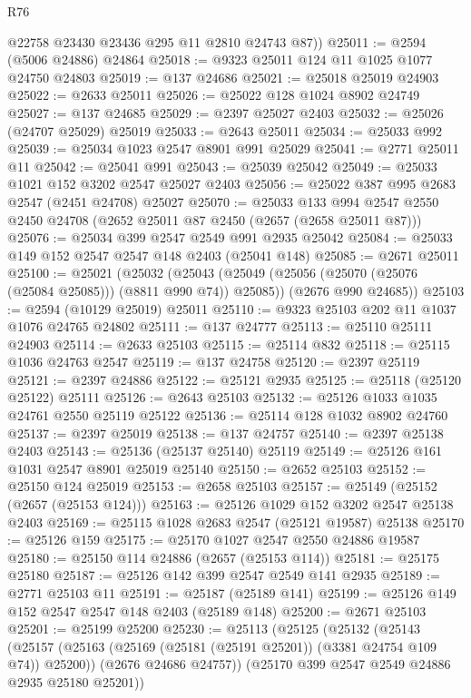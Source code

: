 \begin{lexlean}{R76}
\begin{coremodule}
        @22758
        @23430
        @23436
        @295
        @11
        @2810
        @24743
        @87))
@25011 := @2594 (@5006 @24886) @24864
@25018 := @9323 @25011 @124 @11 @1025 @1077 @24750 @24803
@25019 := @137 @24686
@25021 := @25018 @25019 @24903
@25022 := @2633 @25011
@25026 := @25022 @128 @1024 @8902 @24749
@25027 := @137 @24685
@25029 := @2397 @25027 @2403
@25032 := @25026 (@24707 @25029) @25019
@25033 := @2643 @25011
@25034 := @25033 @992
@25039 := @25034 @1023 @2547 @8901 @991 @25029
@25041 := @2771 @25011 @11
@25042 := @25041 @991
@25043 := @25039 @25042
@25049 := @25033 @1021 @152 @3202 @2547 @25027 @2403
@25056 := @25022 @387 @995 @2683 @2547 (@2451 @24708) @25027
@25070 := @25033
    @133
    @994
    @2547
    @2550
    @2450
    @24708
    (@2652 @25011 @87 @2450 (@2657 (@2658 @25011 @87)))
@25076 := @25034 @399 @2547 @2549 @991 @2935 @25042
@25084 := @25033 @149 @152 @2547 @2547 @148 @2403 (@25041 @148)
@25085 := @2671 @25011
@25100 := @25021
    (@25032
      (@25043 (@25049 (@25056 (@25070 (@25076 (@25084 @25085))) (@8811 @990 @74)) @25085))
      (@2676 @990 @24685))
@25103 := @2594 (@10129 @25019) @25011
@25110 := @9323 @25103 @202 @11 @1037 @1076 @24765 @24802
@25111 := @137 @24777
@25113 := @25110 @25111 @24903
@25114 := @2633 @25103
@25115 := @25114 @832
@25118 := @25115 @1036 @24763 @2547
@25119 := @137 @24758
@25120 := @2397 @25119
@25121 := @2397 @24886
@25122 := @25121 @2935
@25125 := @25118 (@25120 @25122) @25111
@25126 := @2643 @25103
@25132 := @25126 @1033 @1035 @24761 @2550 @25119 @25122
@25136 := @25114 @128 @1032 @8902 @24760
@25137 := @2397 @25019
@25138 := @137 @24757
@25140 := @2397 @25138 @2403
@25143 := @25136 (@25137 @25140) @25119
@25149 := @25126 @161 @1031 @2547 @8901 @25019 @25140
@25150 := @2652 @25103
@25152 := @25150 @124 @25019
@25153 := @2658 @25103
@25157 := @25149 (@25152 (@2657 (@25153 @124)))
@25163 := @25126 @1029 @152 @3202 @2547 @25138 @2403
@25169 := @25115 @1028 @2683 @2547 (@25121 @19587) @25138
@25170 := @25126 @159
@25175 := @25170 @1027 @2547 @2550 @24886 @19587
@25180 := @25150 @114 @24886 (@2657 (@25153 @114))
@25181 := @25175 @25180
@25187 := @25126 @142 @399 @2547 @2549 @141 @2935
@25189 := @2771 @25103 @11
@25191 := @25187 (@25189 @141)
@25199 := @25126 @149 @152 @2547 @2547 @148 @2403 (@25189 @148)
@25200 := @2671 @25103
@25201 := @25199 @25200
@25230 := @25113
    (@25125
      (@25132
        (@25143
          (@25157 (@25163 (@25169 (@25181 (@25191 @25201)) (@3381 @24754 @109 @74)) @25200))
          (@2676 @24686 @24757))
        (@25170 @399 @2547 @2549 @24886 @2935 @25180 @25201))

\end{coremodule}
\end{lexlean}
